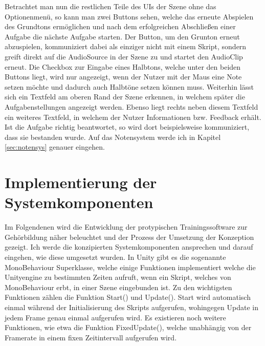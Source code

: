 Betrachtet man nun die restlichen Teile des UIs der Szene ohne das Optionenmenü, so kann man zwei Buttons sehen, welche das erneute Abspielen des Grundtons ermöglichen und nach dem erfolgreichen Abschließen einer Aufgabe die nächste Aufgabe starten. Der Button, um den Grunton erneut abzuspielen, kommuniziert dabei als einziger nicht mit einem Skript, sondern greift direkt auf die AudioSource in der Szene zu und startet den AudioClip erneut. Die Checkbox zur Eingabe eines Halbtons, welche unter den beiden Buttons liegt, wird nur angezeigt, wenn der Nutzer mit der Maus eine Note setzen möchte und dadurch auch Halbtöne setzen können muss. Weiterhin lässt sich ein Textfeld am oberen Rand der Szene erkennen, in welchem später die Aufgabenstellungen angezeigt werden. Ebenso liegt rechts neben diesem Textfeld ein weiteres Textfeld, in welchem der Nutzer Informationen bzw. Feedback erhält. Ist die Aufgabe richtig beantwortet, so wird dort beispielsweise kommuniziert, dass sie bestanden wurde. Auf das Notensystem werde ich in Kapitel \ref{sec:notensys} genauer eingehen. 

\section{Implementierung der Systemkomponenten}
Im Folgendenen wird die Entwicklung der protypischen Trainingssoftware zur Gehörbildung näher beleuchtet und der Prozess der Umsetzung der Konzeption gezeigt. Ich werde die konzipierten Systemkomponenten ansprechen und darauf eingehen, wie diese umgesetzt wurden. 
In Unity gibt es die sogenannte MonoBehaviour Superklasse, welche einige Funktionen implementiert welche die Unityengine zu bestimmten Zeiten aufruft, wenn ein Skript, welches von MonoBehaviour erbt, in einer Szene eingebunden ist. Zu den wichtigsten Funktionen zählen die Funktion Start() und Update(). Start wird automatisch einmal während der Initialisierung des Skripts aufgerufen, wohingegen Update in jedem Frame genau einmal aufgerufen wird. Es existieren noch weitere Funktionen, wie etwa die Funktion FixedUpdate(), welche unabhängig von der Framerate in einem fixen Zeitintervall aufgerufen wird.

